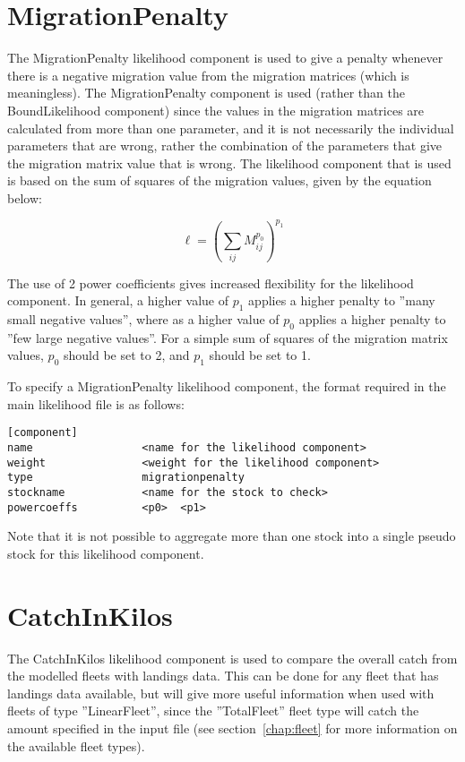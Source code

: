 \documentclass[10pt,twoside]{book}
\begin{document}
\section{MigrationPenalty}\label{sec:migpenalty}
The MigrationPenalty likelihood component is used to give a penalty whenever there is a negative migration value from the migration matrices (which is meaningless).  The MigrationPenalty component is used (rather than the BoundLikelihood component) since the values in the migration matrices are calculated from more than one parameter, and it is not necessarily the individual parameters that are wrong, rather the combination of the parameters that give the migration matrix value that is wrong.  The likelihood component that is used is based on the sum of squares of the migration values, given by the equation below:

\begin{equation}\label{eq:migpenalty}
\ell = \left( \sum_{ij}^{} M_{ij}^{p_0} \right)^{p_1}
\end{equation}

\bigskip
The use of 2 power coefficients gives increased flexibility for the likelihood component.  In general, a higher value of $p_1$ applies a higher penalty to ''many small negative values'', where as a higher value of $p_0$ applies a higher penalty to ''few large negative values''.  For a simple sum of squares of the migration matrix values, $p_0$ should be set to 2, and $p_1$ should be set to 1.

\bigskip
To specify a MigrationPenalty likelihood component, the format required in the main likelihood file is as follows:

{\small\begin{verbatim}
[component]
name                 <name for the likelihood component>
weight               <weight for the likelihood component>
type                 migrationpenalty
stockname            <name for the stock to check>
powercoeffs          <p0>  <p1>
\end{verbatim}}

Note that it is not possible to aggregate more than one stock into a single pseudo stock for this likelihood component.

\section{CatchInKilos}\label{sec:catchinkilos}
The CatchInKilos likelihood component is used to compare the overall catch from the modelled fleets with landings data.  This can be done for any fleet that has landings data available, but will give more useful information when used with fleets of type ''LinearFleet'', since the ''TotalFleet'' fleet type will catch the amount specified in the input file (see section~\ref{chap:fleet} for more information on the available fleet types).
\end{document}
